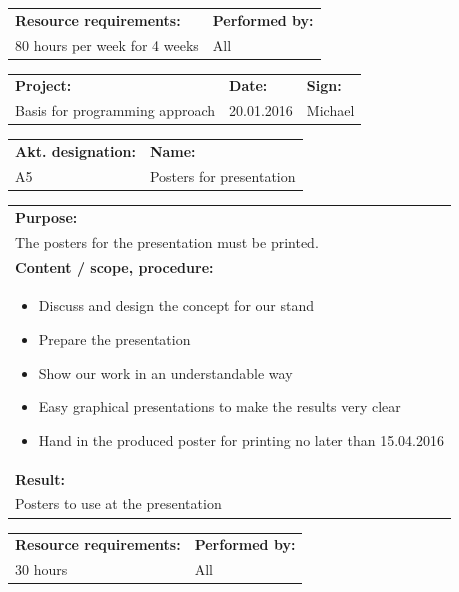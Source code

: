 \documentclass[12pt, a4paper]{article}
\begin{document}
\begin{tabularx}{\textwidth}{|X|p{30mm}|}
	\textbf{Resource requirements:}&\textbf{Performed by:}\\
	80 hours per week for 4 weeks&All\\
	\hline
\end{tabularx}

\newpage

\begin{tabularx}{\textwidth}{|X|p{32mm}|p{20mm}|}
	\hline
	\textbf{Project:}&\textbf{Date:}&\textbf{Sign:}\\
	Basis for programming approach&20.01.2016&Michael\\
	\hline
\end{tabularx}

\begin{tabularx}{\textwidth}{|p{40mm}|X|}
	\textbf{Akt. designation:}&\textbf{Name:}\\
	A5&Posters for presentation  \\
	\hline
\end{tabularx}

\begin{tabularx}{\textwidth}{|X|}
	\textbf{Purpose:}\\
	The posters for the presentation must be printed.\\
	\hline
	\textbf{Content / scope, procedure:}\\
	\begin{itemize}
		\item Discuss and design the concept for our stand
		\item Prepare the presentation
		\item Show our work in an understandable way
		\item Easy graphical presentations to make the results very clear
		\item Hand in the produced poster for printing no later than 15.04.2016

	\end{itemize}\\
 	\hline
	\textbf{Result:}\\
	Posters to use at the presentation \\
	\hline
\end{tabularx}

\begin{tabularx}{\textwidth}{|X|p{30mm}|}
	\textbf{Resource requirements:}&\textbf{Performed by:}\\
	30 hours&All\\
	\hline
\end{tabularx}
\end{document}
